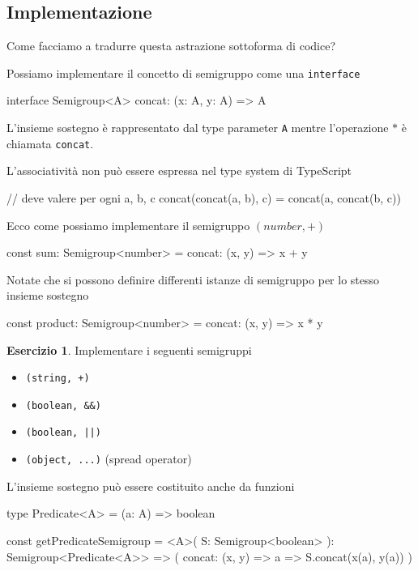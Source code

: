 \documentclass[12pt]{article}
\theoremstyle{definition}
\newtheorem{exercise}{Esercizio}[section]
\newenvironment{code}
  {\vspace{0.5cm} \VerbatimEnvironment\begin{typescriptcode}}
  {\end{typescriptcode} \vspace{0.2cm}}
\begin{document}
\subsection{Implementazione}

Come facciamo a tradurre questa astrazione sottoforma di codice?

Possiamo implementare il concetto di semigruppo come una \texttt{interface}

\begin{code}
interface Semigroup<A> {
  concat: (x: A, y: A) => A
}
\end{code}

L'insieme sostegno è rappresentato dal type parameter \texttt{A} mentre l'operazione $*$ è chiamata \texttt{concat}.

L'associatività non può essere espressa nel type system di TypeScript

\begin{code}
// deve valere per ogni a, b, c
concat(concat(a, b), c) = concat(a, concat(b, c))
\end{code}

Ecco come possiamo implementare il semigruppo $(number, +)$

\begin{code}
const sum: Semigroup<number> = {
  concat: (x, y) => x + y
}
\end{code}

Notate che si possono definire differenti istanze di semigruppo per lo stesso insieme sostegno

\begin{code}
const product: Semigroup<number> = {
  concat: (x, y) => x * y
}
\end{code}

\begin{exercise}
Implementare i seguenti semigruppi
\begin{itemize}
  \item \texttt{(string, +)}
  \item \texttt{(boolean, \&\&)}
  \item \texttt{(boolean, ||)}
  \item \texttt{(object, ...)} (spread operator)
\end{itemize}
\end{exercise}

L'insieme sostegno può essere costituito anche da funzioni

\begin{code}
type Predicate<A> = (a: A) => boolean

const getPredicateSemigroup = <A>(
  S: Semigroup<boolean>
): Semigroup<Predicate<A>> => ({
  concat: (x, y) => a => S.concat(x(a), y(a))
})
\end{code}
\end{document}
